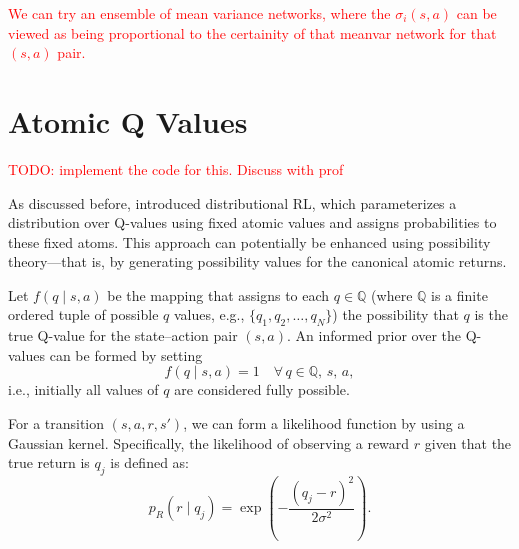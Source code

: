 \documentclass[12pt,a4paper]{report}
\newcommand\myworries[1]{\textcolor{red}{#1}}
\begin{document}
%
%
%
%
%


\myworries{We can try an ensemble of mean variance networks, where the $\sigma_i(s, a)$ can be viewed as being proportional to the certainity of that meanvar network for that $(s,a)$ pair.}

\section{Atomic Q Values}
\myworries{TODO: implement the code for this. Discuss with prof}\par
As discussed before, \cite{bellemare2017} introduced distributional RL, which parameterizes a distribution over Q-values using fixed atomic values and assigns probabilities to these fixed atoms. This approach can potentially be enhanced using possibility theory—that is, by generating possibility values for the canonical atomic returns.

Let \( f(q \mid s, a) \) be the mapping that assigns to each \( q \in \mathbb{Q} \) (where \(\mathbb{Q}\) is a finite ordered tuple of possible \(q\) values, e.g., \(\{q_1, q_2, \dots, q_N\}\)) the possibility that \(q\) is the true Q-value for the state–action pair \((s,a)\). An informed prior over the Q-values can be formed by setting 
\[
f(q \mid s, a) = 1 \quad \forall\, q \in \mathbb{Q},\, s,\, a,
\]
i.e., initially all values of \(q\) are considered fully possible.

For a transition \((s, a, r, s')\), we can form a likelihood function by using a Gaussian kernel. Specifically, the likelihood of observing a reward \(r\) given that the true return is \(q_j\) is defined as:
\[
p_{R}(r \mid q_j) = \exp\!\left(-\frac{(q_j - r)^2}{2\sigma^2}\right).
\]
\end{document}
